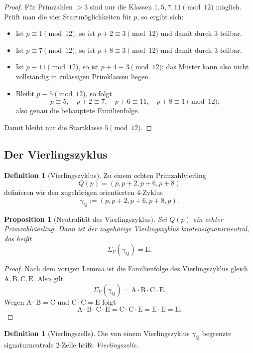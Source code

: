 \documentclass[11pt,a4paper]{article}
\newtheorem{proposition}[theorem]{Proposition}
\theoremstyle{definition}
\newtheorem{definition}[theorem]{Definition}
\theoremstyle{remark}
\newcommand{\Efam}{\mathrm{E}}
\newcommand{\Afam}{\mathrm{A}}
\newcommand{\Bfam}{\mathrm{B}}
\newcommand{\Cfam}{\mathrm{C}}
\begin{document}
	\begin{proof}
		Für Primzahlen $>3$ sind nur die Klassen $1,5,7,11\pmod{12}$ möglich. Prüft man die vier Startmöglichkeiten für $p$, so ergibt sich:
		\begin{itemize}[itemsep=0.2em]
			\item Ist $p\equiv 1\pmod{12}$, so ist $p+2\equiv 3\pmod{12}$ und damit durch $3$ teilbar.
			\item Ist $p\equiv 7\pmod{12}$, so ist $p+8\equiv 3\pmod{12}$ und damit durch $3$ teilbar.
			\item Ist $p\equiv 11\pmod{12}$, so ist $p+4\equiv 3\pmod{12}$; das Muster kann also nicht vollständig in zulässigen Primklassen liegen.
			\item Bleibt $p\equiv 5\pmod{12}$, so folgt
			\[
			p\equiv 5,\quad p+2\equiv 7,\quad p+6\equiv 11,\quad p+8\equiv 1\pmod{12},
			\]
			also genau die behauptete Familienfolge.
		\end{itemize}
		Damit bleibt nur die Startklasse $5\pmod{12}$.
	\end{proof}
	
	\subsection{Der Vierlingszyklus}
	
	\begin{definition}[Vierlingszyklus]
		Zu einem echten Primzahlvierling
		\[
		Q(p)=(p,p+2,p+6,p+8)
		\]
		definieren wir den zugehörigen orientierten $4$-Zyklus
		\[
		\gamma_Q:=(p,p+2,p+6,p+8,p).
		\]
	\end{definition}
	
	\begin{proposition}[Neutralität des Vierlingszyklus]
		Sei $Q(p)$ ein echter Primzahlvierling. Dann ist der zugehörige Vierlingszyklus knotensignaturneutral, das heißt
		\[
		\Sigma_V(\gamma_Q)=\Efam.
		\]
	\end{proposition}
	
	\begin{proof}
		Nach dem vorigen Lemma ist die Familienfolge des Vierlingszyklus gleich $\Afam,\Bfam,\Cfam,\Efam$. Also gilt
		\[
		\Sigma_V(\gamma_Q)=\Afam\cdot\Bfam\cdot\Cfam\cdot\Efam.
		\]
		Wegen $\Afam\cdot\Bfam=\Cfam$ und $\Cfam\cdot\Cfam=\Efam$ folgt
		\[
		\Afam\cdot\Bfam\cdot\Cfam\cdot\Efam
		=\Cfam\cdot\Cfam\cdot\Efam
		=\Efam\cdot\Efam
		=\Efam.
		\]
	\end{proof}
	
	\begin{definition}[Vierlingszelle]
		Die von einem Vierlingszyklus $\gamma_Q$ begrenzte signaturneutrale $2$-Zelle heißt \emph{Vierlingszelle}.
	\end{definition}
	
\end{document}
